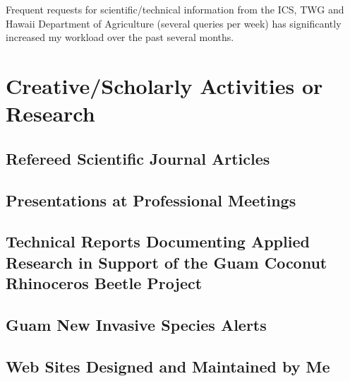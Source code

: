 \documentclass[12pt,oneside,english]{scrbook}
\begin{document}
Frequent requests for scientific/technical information from the ICS,
TWG and Hawaii Department of Agriculture (several queries per week)
has significantly increased my workload over the past several months.

\pagebreak{}

\chapter{Creative/Scholarly Activities or Research}

\section{Refereed Scientific Journal Articles}

\begingroup
\let\clearpage\relax
\printbibliography[heading=none,	keyword=cfes2015, keyword=journal]
\endgroup

\section{Presentations at Professional Meetings}

\begingroup
\let\clearpage\relax
\printbibliography[heading=none,	keyword=cfes2015, keyword=presentation]
\endgroup

\section{Technical Reports Documenting Applied Research in Support of the
Guam Coconut Rhinoceros Beetle Project}

\begingroup
\let\clearpage\relax
\printbibliography[heading=none,	keyword=cfes2015, keyword=crbtechreport]
\endgroup

\section{Guam New Invasive Species Alerts}

\begingroup
\let\clearpage\relax
\printbibliography[heading=none,	keyword=cfes2015, keyword=gisa]
\endgroup

\section{\label{sec:Web-Sites-Designed}Web Sites Designed and Maintained
by Me}
\end{document}
